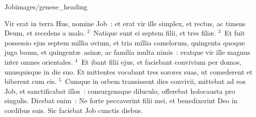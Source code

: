 {Job}{images/genese_heading}


\lettrine[lines=10,image=true,loversize=0.05,lraise=-0.03]{V}{}ir erat in terra Hus, nomine Job~: et erat vir ille simplex, et rectus, ac timens Deum, et recedens a malo.
${}^{2}$~Natique sunt ei septem filii, et tres fili\ae .
${}^{3}$~Et fuit possessio ejus septem millia ovium, et tria millia camelorum, quingenta quoque juga boum, et quingent\ae\ asin\ae , ac familia multa nimis~: eratque vir ille magnus inter omnes orientales.
${}^{4}$~Et ibant filii ejus, et faciebant convivium per domos, unusquisque in die suo. Et mittentes vocabant tres sorores suas, ut comederent et biberent cum eis.
${}^{5}$~Cumque in orbem transissent dies convivii, mittebat ad eos Job, et sanctificabat illos~: consurgensque diluculo, offerebat holocausta pro singulis. Dicebat enim~: Ne forte peccaverint filii mei, et benedixerint Deo in cordibus suis. Sic faciebat Job cunctis diebus.


